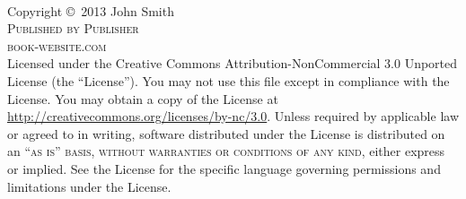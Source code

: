 \maketitle  %

\setcounter{page}{1}



\begingroup
\thispagestyle{empty}
\vfill
\endgroup


\newpage
~\vfill
\thispagestyle{empty}

\noindent Copyright \copyright\ 2013 John Smith\\ %

\noindent \textsc{Published by Publisher}\\ %

\noindent \textsc{book-website.com}\\ %

\noindent Licensed under the Creative Commons Attribution-NonCommercial 3.0 Unported License (the ``License''). You may not use this file except in compliance with the License. You may obtain a copy of the License at \url{http://creativecommons.org/licenses/by-nc/3.0}. Unless required by applicable law or agreed to in writing, software distributed under the License is distributed on an \textsc{``as is'' basis, without warranties or conditions of any kind}, either express or implied. See the License for the specific language governing permissions and limitations under the License.\\ %

